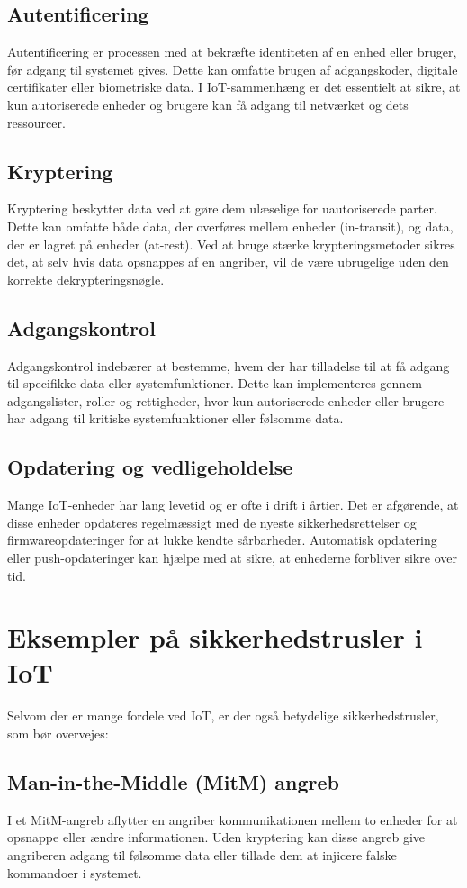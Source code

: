 \subsection*{Autentificering}
Autentificering er processen med at bekræfte identiteten af en enhed eller bruger, før adgang til systemet gives. Dette kan omfatte brugen af adgangskoder, digitale certifikater eller biometriske data. I IoT-sammenhæng er det essentielt at sikre, at kun autoriserede enheder og brugere kan få adgang til netværket og dets ressourcer.

\subsection*{Kryptering}
Kryptering beskytter data ved at gøre dem ulæselige for uautoriserede parter. Dette kan omfatte både data, der overføres mellem enheder (in-transit), og data, der er lagret på enheder (at-rest). Ved at bruge stærke krypteringsmetoder sikres det, at selv hvis data opsnappes af en angriber, vil de være ubrugelige uden den korrekte dekrypteringsnøgle.

\subsection*{Adgangskontrol}
Adgangskontrol indebærer at bestemme, hvem der har tilladelse til at få adgang til specifikke data eller systemfunktioner. Dette kan implementeres gennem adgangslister, roller og rettigheder, hvor kun autoriserede enheder eller brugere har adgang til kritiske systemfunktioner eller følsomme data.

\subsection*{Opdatering og vedligeholdelse}
Mange IoT-enheder har lang levetid og er ofte i drift i årtier. Det er afgørende, at disse enheder opdateres regelmæssigt med de nyeste sikkerhedsrettelser og firmwareopdateringer for at lukke kendte sårbarheder. Automatisk opdatering eller push-opdateringer kan hjælpe med at sikre, at enhederne forbliver sikre over tid.

\section*{Eksempler på sikkerhedstrusler i IoT}
Selvom der er mange fordele ved IoT, er der også betydelige sikkerhedstrusler, som bør overvejes:

\subsection*{Man-in-the-Middle (MitM) angreb}
I et MitM-angreb aflytter en angriber kommunikationen mellem to enheder for at opsnappe eller ændre informationen. Uden kryptering kan disse angreb give angriberen adgang til følsomme data eller tillade dem at injicere falske kommandoer i systemet.

